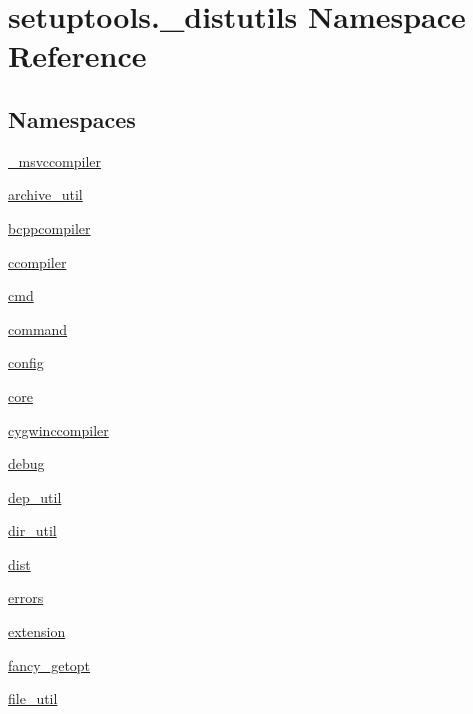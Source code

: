 \hypertarget{namespacesetuptools_1_1__distutils}{}\section{setuptools.\+\_\+distutils Namespace Reference}
\label{namespacesetuptools_1_1__distutils}
\subsection*{Namespaces}
\begin{DoxyCompactItemize}
\item 
 \hyperlink{namespacesetuptools_1_1__distutils_1_1__msvccompiler}{\+\_\+msvccompiler}
\item 
 \hyperlink{namespacesetuptools_1_1__distutils_1_1archive__util}{archive\+\_\+util}
\item 
 \hyperlink{namespacesetuptools_1_1__distutils_1_1bcppcompiler}{bcppcompiler}
\item 
 \hyperlink{namespacesetuptools_1_1__distutils_1_1ccompiler}{ccompiler}
\item 
 \hyperlink{namespacesetuptools_1_1__distutils_1_1cmd}{cmd}
\item 
 \hyperlink{namespacesetuptools_1_1__distutils_1_1command}{command}
\item 
 \hyperlink{namespacesetuptools_1_1__distutils_1_1config}{config}
\item 
 \hyperlink{namespacesetuptools_1_1__distutils_1_1core}{core}
\item 
 \hyperlink{namespacesetuptools_1_1__distutils_1_1cygwinccompiler}{cygwinccompiler}
\item 
 \hyperlink{namespacesetuptools_1_1__distutils_1_1debug}{debug}
\item 
 \hyperlink{namespacesetuptools_1_1__distutils_1_1dep__util}{dep\+\_\+util}
\item 
 \hyperlink{namespacesetuptools_1_1__distutils_1_1dir__util}{dir\+\_\+util}
\item 
 \hyperlink{namespacesetuptools_1_1__distutils_1_1dist}{dist}
\item 
 \hyperlink{namespacesetuptools_1_1__distutils_1_1errors}{errors}
\item 
 \hyperlink{namespacesetuptools_1_1__distutils_1_1extension}{extension}
\item 
 \hyperlink{namespacesetuptools_1_1__distutils_1_1fancy__getopt}{fancy\+\_\+getopt}
\item 
 \hyperlink{namespacesetuptools_1_1__distutils_1_1file__util}{file\+\_\+util}

\end{DoxyCompactItemize}

